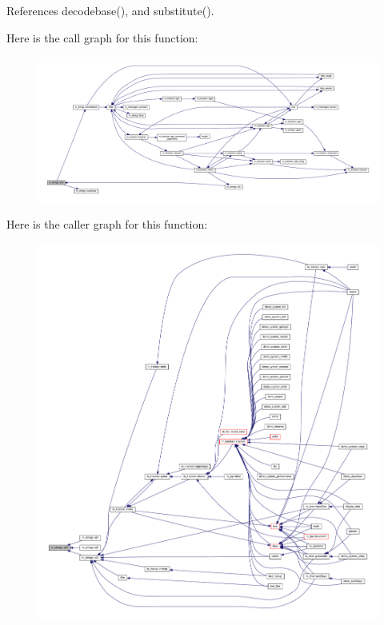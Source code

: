 References decodebase(), and substitute().

Here is the call graph for this function\+:
\nopagebreak
\begin{figure}[H]
\begin{center}
\leavevmode
\includegraphics[width=350pt]{namespacem__strings_a751d3101d8404ea10db4d8ba59a75d6b_cgraph}
\end{center}
\end{figure}
Here is the caller graph for this function\+:
\nopagebreak
\begin{figure}[H]
\begin{center}
\leavevmode
\includegraphics[width=350pt]{namespacem__strings_a751d3101d8404ea10db4d8ba59a75d6b_icgraph}
\end{center}
\end{figure}
\mbox{\label{namespacem__strings_aca902af295ede82fb0c45174bbfe6eef}} 
